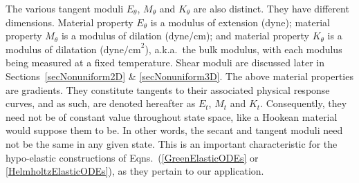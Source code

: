 The various tangent moduli $E_{\theta}$, $M_{\theta}$ and $K_{\theta}$ are also distinct.  They have different dimensions.  Material property $E_{\theta}$ is a modulus of extension (dyne); material property $M_{\theta}$ is a modulus of dilation (dyne/cm); and material property $K_{\theta}$ is a modulus of dilatation ($\text{dyne/cm}^2$), a.k.a.\ the bulk modulus, with each modulus being measured at a fixed temperature.  Shear moduli are discussed later in Sections~\ref{secNonuniform2D} \& \ref{secNonuniform3D}.  The above material properties are gradients.  They constitute tangents to their associated physical response curves, and as such, are denoted hereafter as $E_t$, $M_t$ and $K_t$.  Consequently, they need not be of constant value throughout state space, like a Hookean material would suppose them to be.  In other words, the secant and tangent moduli need not be the same in any given state.  This is an important characteristic for the hypo-elastic constructions of Eqns.~(\ref{GreenElasticODEs} or \ref{HelmholtzElasticODEs}), as they pertain to our application. 

